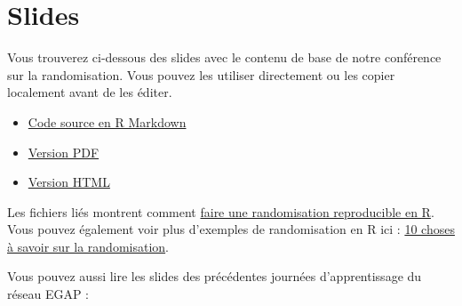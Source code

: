 \documentclass[12pt,]{book}
\begin{document}
\hypertarget{slides-2}{%
\section{Slides}\label{slides-2}}

Vous trouverez ci-dessous des slides avec le contenu de base de notre conférence sur la randomisation. Vous pouvez les utiliser directement ou les copier localement avant de les éditer.

\begin{itemize}
\item
  \href{https://egap.github.io/learningdays-resources/Slides_fr/randomization-slides.Rmd}{Code source en R Markdown}
\item
  \href{https://egap.github.io/learningdays-resources/Slides_fr/randomization-slides.pdf}{Version PDF}
\item
  \href{https://egap.github.io/learningdays-resources/Slides_fr/randomization-slides.html}{Version HTML}
\end{itemize}

Les fichiers liés montrent comment \href{https://egap.github.io/learningdays-resources/Exercises/randomization-exercises.Rmd}{faire une randomisation reproducible en R}.
Vous pouvez également voir plus d'exemples de randomisation en R ici : \href{https://egap.org/resource/10-things-to-know-about-randomization/}{10 choses à savoir sur la randomisation}.

Vous pouvez aussi lire les slides des précédentes journées d'apprentissage du réseau EGAP :
\end{document}
